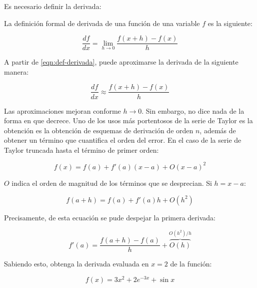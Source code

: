 \begin{ex}

	Es necesario definir la derivada:

	\begin{definition}[La derivada]
		La definición formal de derivada de una función de una variable $f$ es
		la siguiente:

		\begin{equation}\label{eqn:def-derivada}
			\frac{df}{dx} = \lim_{h \rightarrow 0} \frac{f(x + h) - f(x)}{h}
		\end{equation}

	\end{definition}
	A partir de \ref{eqn:def-derivada}, puede aproximarse la derivada de la
	siguiente manera:

	\begin{equation*}
		\frac{df}{dx} \approx \frac{f(x + h) - f(x)}{h}
	\end{equation*}

	Las aproximaciones mejoran conforme $h \rightarrow 0$. Sin embargo, no
	dice nada de la forma en que decrece. Uno de los usos más portentosos de
	la serie de Taylor es la obtención es la obtención de esquemas de
	derivación de orden $n$, además de obtener un término que cuantifica el
	orden del error. En el caso de la serie de Taylor truncada hasta el
	término de primer orden:

	\begin{equation*}
		f(x) = f(a) + f'(a)(x-a) + O(x-a)^2
	\end{equation*}

	$O$ indica el orden de magnitud de los términos que se desprecian. Si
	$h = x - a$:

	\begin{equation*}
		f(a + h) = f(a) + f'(a)h + O(h^2)
	\end{equation*}

	Precisamente, de esta ecuación se pude despejar la primera derivada:

	\begin{equation*}
		f'(a) = \frac{f(a + h) - f(a)}{h} + \overbrace{O(h)}^{O(h^2)/h}
	\end{equation*}

	Sabiendo esto, obtenga la derivada evaluada en $x = 2$ de la función:

	\begin{equation*}
		f(x) = 3x^2 + 2e^{-3x} + \sin x
	\end{equation*}


\end{ex}
